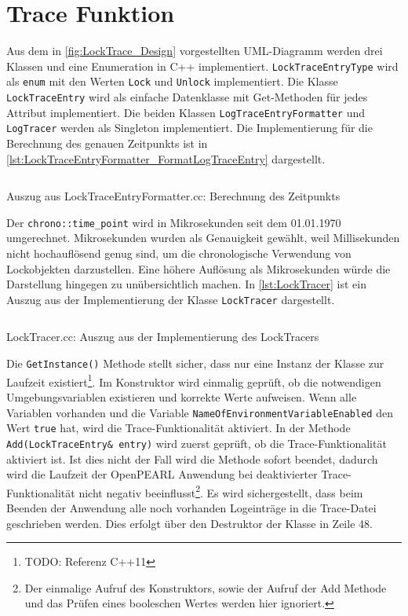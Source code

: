 \section{Trace Funktion}
\label{section:Implementierung:Trace Funktion}
Aus dem in \cref{fig:LockTrace_Design} vorgestellten UML-Diagramm werden drei
Klassen und eine Enumeration in C++ implementiert.
\texttt{Lock\-Trace\-Entry\-Type} wird als \texttt{enum} mit den Werten
\texttt{Lock} und \texttt{Unlock} implementiert. Die Klasse
\texttt{LockTraceEntry} wird als einfache Datenklasse mit Get-Methoden für jedes
Attribut implementiert. Die beiden Klassen \texttt{Log\-Trace\-Entry\-Formatter}
und \texttt{LogTracer} werden als Singleton implementiert. Die Implementierung
für die Berechnung des genauen Zeitpunkts ist in
\cref{lst:LockTraceEntryFormatter_FormatLogTraceEntry} dargestellt.
\begin{listing}[ht]
  \inputminted[frame=lines,linenos,firstline=31,lastline=33]{cpp}{./cpp/LockTraceEntryFormatter.cc}
  \caption{Auszug aus LockTraceEntryFormatter.cc: Berechnung des Zeitpunkts}
  \label{lst:LockTraceEntryFormatter_FormatLogTraceEntry}   
\end{listing}
Der \texttt{chrono::time\_point} wird in Mikrosekunden seit dem 01.01.1970
umgerechnet. Mikrosekunden wurden als Genauigkeit gewählt, weil Millisekunden
nicht hochauflösend genug sind, um die chronologische Verwendung von
Lockobjekten darzustellen. Eine höhere Auflösung als Mikrosekunden würde die
Darstellung hingegen zu unübersichtlich machen. In \cref{lst:LockTracer} ist ein
Auszug aus der Implementierung der Klasse \texttt{LockTracer} dargestellt.
\begin{listing}[ht]
  \inputminted[frame=lines,linenos,firstline=11,lastline=54]{cpp}{./cpp/LockTracer.cc}
  \caption{LockTracer.cc: Auszug aus der Implementierung des LockTracers}
  \label{lst:LockTracer}
\end{listing}
Die \texttt{GetInstance()} Methode stellt sicher, dass nur eine Instanz der
Klasse zur Laufzeit existiert\footnote{TODO: Referenz C++11}. Im Konstruktor
wird einmalig geprüft, ob die notwendigen Umgebungsvariablen existieren und
korrekte Werte aufweisen. Wenn alle Variablen vorhanden und die Variable
\texttt{Name\-Of\-Environment\-Variable\-Enabled} den Wert \texttt{true} hat,
wird die Trace-Funktionalität aktiviert. In der Methode
\texttt{Add(Lock\-Trace\-Entry\& entry)} wird zuerst geprüft, ob die
Trace-Funktionalität aktiviert ist. Ist dies nicht der Fall wird die Methode
sofort beendet, dadurch wird die Laufzeit der OpenPEARL Anwendung bei
deaktivierter Trace-Funktionalität nicht negativ beeinflusst\footnote{Der
einmalige Aufruf des Konstruktors, sowie der Aufruf der Add Methode und das
Prüfen eines booleschen Wertes werden hier ignoriert.}. Es wird sichergestellt,
dass beim Beenden der Anwendung alle noch vorhanden Logeinträge in die
Trace-Datei geschrieben werden. Dies erfolgt über den Destruktor der Klasse in
Zeile 48.
